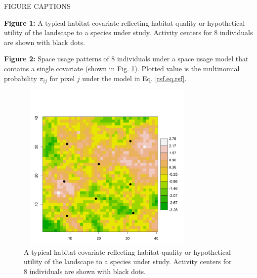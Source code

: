\documentclass[12pt]{article}
\begin{document}
\clearpage

\newpage


{\flushleft FIGURE CAPTIONS }

\vspace{.2in}


{\flushleft \bf
Figure 1:}
A typical habitat covariate reflecting habitat quality or
  hypothetical utility of the landscape to a species under
  study. Activity
centers for 8 individuals are
shown with black dots.

\vspace{.2in}

{\flushleft \bf Figure 2:}
Space usage patterns of 8 individuals under a space usage
  model that contains a single covariate (shown in
  Fig. \ref{rsf.fig.habitat}). Plotted value is the multinomial
  probability $\pi_{ij}$ for pixel $j$ under the model in Eq. \ref{rsf.eq.rsf}.


\newpage


\begin{figure}
\centering
\includegraphics[width=3.5in,height=3.25in]{figs/habitat.png}
\caption{A typical habitat covariate reflecting habitat quality or
  hypothetical utility of the landscape to a species under
  study. Activity
centers for 8 individuals are
shown with black dots.}
\label{rsf.fig.habitat}
\end{figure}
\end{document}
